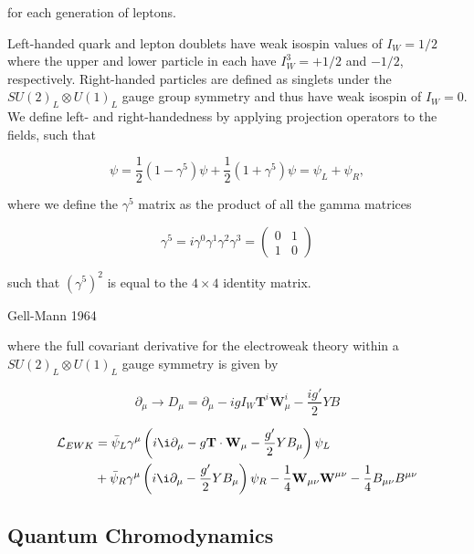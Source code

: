 for each generation of leptons. 

Left-handed quark and lepton doublets have weak isospin values of $I_W = 1/2$ where the upper and lower particle in each have $I^3_W = +1/2$ and $−1/2$, respectively. Right-handed particles are defined as singlets under the $SU(2)_L \otimes U(1)_L$ gauge group symmetry and thus have weak isospin of $I_W = 0$. We define left- and right-handedness by applying projection operators to the fields, such that

\begin{equation}
\psi = \frac{1}{2}(1-\gamma^5)\psi + \frac{1}{2}(1+\gamma^5)\psi = \psi_L + \psi_R,
\end{equation}

where we define the $\gamma^5$ matrix as the product of all the gamma matrices

\begin{equation}
\gamma^5 = i\gamma^0 \gamma^1 \gamma^2 \gamma^3 = 
\begin{pmatrix}
0 & 1 \\
1 & 0
\end{pmatrix}
\end{equation}

such that $\left(\gamma^5\right)^2$ is equal to the $4 \times 4$ identity matrix.

Gell-Mann 1964 \cite{GellMann:1964nj}

where the full covariant derivative for the electroweak theory within a $SU(2)_L \otimes U(1)_L$ gauge symmetry is given by

\begin{equation}
\partial_{\mu} \to D_{\mu} = \partial_{\mu} - igI_W \textbf{T}^i\textbf{W}^i_{\mu} - \frac{ig'}{2}YB
\end{equation}

\begin{equation}
\begin{split}
\lumi_{EWK} & = \bar{\psi}_L \gamma^{\mu} \left(i \i\partial_{\mu} - g\textbf{T} \cdot \textbf{W}_{\mu} - \frac{g'}{2} Y B_{\mu}\right)\psi_L \\
& + \bar{\psi}_R \gamma^{\mu}\left(i \i\partial_{\mu} - \frac{g'}{2} Y B_{\mu}\right)\psi_R - \frac{1}{4}\textbf{W}_{\mu \nu}\textbf{W}^{\mu \nu} - \frac{1}{4} B_{\mu \nu} B^{\mu \nu} 
\end{split}
\end{equation}

\subsection{Quantum Chromodynamics} \label{subsec-QuantumChromodynamics}

